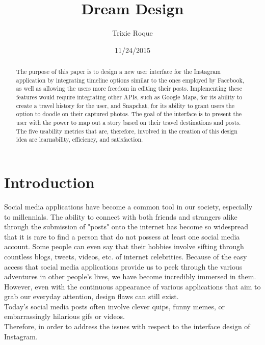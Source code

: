 \documentclass[11pt]{article}
\title{Dream Design}
\author{Trixie Roque}
\date{11/24/2015}
\begin{document}
\maketitle

\begin{abstract}
The purpose of this paper is to design a new user interface for the Instagram application by integrating timeline options similar to the ones employed by Facebook, as well as allowing the users more freedom in editing their posts. Implementing these features would require integrating other APIs, such as Google Maps, for its ability to create a travel history for the user, and Snapchat, for its ability to grant users the option to doodle on their captured photos. The goal of the interface is to present the user with the power to map out a story based on their travel destinations and posts. The five usability metrics that are, therefore, involved in the creation of this design idea are learnability, efficiency, and satisfaction.
\end{abstract}

\pagebreak
\tableofcontents

\pagebreak

\section{Introduction}
\label{Introduction}
    \indent Social media applications have become a common tool in our society, especially to millennials. The ability to connect with both friends and strangers alike through the submission of "posts" onto the internet has become so widespread that it is rare to find a person that do not possess at least one social media account. Some people can even say that their hobbies involve sifting through countless blogs, tweets, videos, etc. of internet celebrities. Because of the easy access that social media applications provide us to peek through the various adventures in other people's lives, we have become incredibly immersed in them. However, even with the continuous appearance of various applications that aim to grab our everyday attention, design flaws can still exist. \\
     \indent Today's social media posts often involve clever quips, funny memes, or embarrassingly hilarious gifs or videos. 
\\
    \indent Therefore, in order to address the issues with respect to the interface design of Instagram.

\pagebreak
\end{document}
